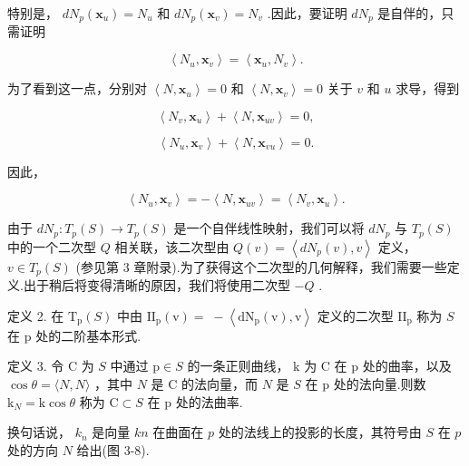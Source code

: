 特别是， \(d{N}_{p}\left( {\mathbf{x}}_{u}\right)  = {N}_{u}\) 和 \(d{N}_{p}\left( {\mathbf{x}}_{v}\right)  = {N}_{v}\) .因此，要证明 \(d{N}_{p}\) 是自伴的，只需证明

\[
\left\langle  {{N}_{u},{\mathbf{x}}_{v}}\right\rangle   = \left\langle  {{\mathbf{x}}_{u},{N}_{v}}\right\rangle  .
\]

为了看到这一点，分别对 \(\left\langle  {N,{\mathbf{x}}_{u}}\right\rangle   = 0\) 和 \(\left\langle  {N,{\mathbf{x}}_{v}}\right\rangle   = 0\) 关于 \(v\) 和 \(u\) 求导，得到

\[
\left\langle  {{N}_{v},{\mathbf{x}}_{u}}\right\rangle   + \left\langle  {N,{\mathbf{x}}_{uv}}\right\rangle   = 0,
\]

\[
\left\langle  {{N}_{u},{\mathbf{x}}_{v}}\right\rangle   + \left\langle  {N,{\mathbf{x}}_{vu}}\right\rangle   = 0.
\]

因此，

\[
\left\langle  {{N}_{u},{\mathbf{x}}_{v}}\right\rangle   =  - \left\langle  {N,{\mathbf{x}}_{uv}}\right\rangle   = \left\langle  {{N}_{v},{\mathbf{x}}_{u}}\right\rangle  . \tag{Q.E.D.}
\]

由于 \(d{N}_{p} : {T}_{p}\left( S\right)  \rightarrow  {T}_{p}\left( S\right)\) 是一个自伴线性映射，我们可以将 \(d{N}_{p}\) 与 \({T}_{p}\left( S\right)\) 中的一个二次型 \(Q\) 相关联，该二次型由 \(Q\left( v\right)  = \left\langle  {d{N}_{p}\left( v\right) ,v}\right\rangle\) 定义， \(v \in  {T}_{p}\left( S\right)\) (参见第 3 章附录).为了获得这个二次型的几何解释，我们需要一些定义.出于稍后将变得清晰的原因，我们将使用二次型 \(- Q\) .

定义 2. 在 \({\mathrm{T}}_{\mathrm{p}}\left( S\right)\) 中由 \({\mathrm{{II}}}_{\mathrm{p}}\left( \mathrm{v}\right)  = \; - \left\langle  {{\mathrm{{dN}}}_{\mathrm{p}}\left( \mathrm{v}\right) ,\mathrm{v}}\right\rangle\) 定义的二次型 \({\mathrm{{II}}}_{\mathrm{p}}\) 称为 \(S\) 在 \(\mathrm{p}\) 处的二阶基本形式.

定义 3. 令 \(\mathrm{C}\) 为 \(S\) 中通过 \(\mathrm{p} \in  S\) 的一条正则曲线， \(\mathrm{k}\) 为 \(\mathrm{C}\) 在 \(\mathrm{p}\) 处的曲率，以及 \(\cos \theta  = \langle N,N\rangle\) ，其中 \(N\) 是 \(\mathrm{C}\) 的法向量，而 \(N\) 是 \(S\) 在 \(\mathrm{p}\) 处的法向量.则数 \({\mathrm{k}}_{N} = \mathrm{k}\cos \theta\) 称为 \(\mathrm{C} \subset  S\) 在 \(\mathrm{p}\) 处的法曲率.

换句话说， \({k}_{n}\) 是向量 \({kn}\) 在曲面在 \(p\) 处的法线上的投影的长度，其符号由 \(S\) 在 \(p\) 处的方向 \(N\) 给出(图 3-8).

